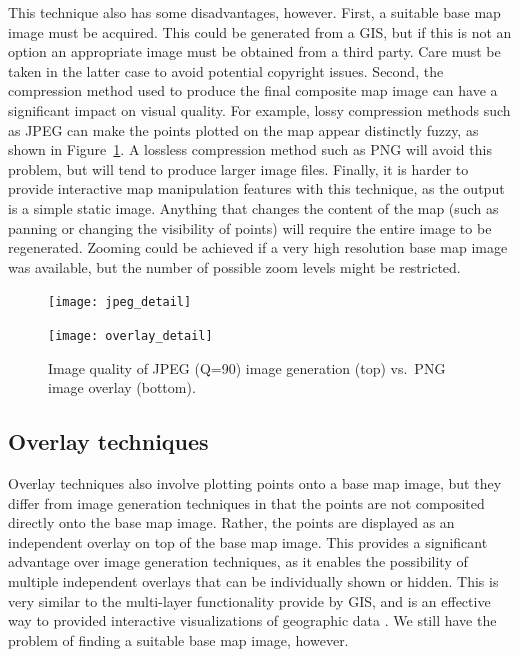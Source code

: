 \documentclass[acmtocl,acmnow]{acmtrans2m}
\begin{document}
This technique also has some disadvantages, however. First, a suitable
base map image must be acquired. This could be generated from a GIS, but
if this is not an option an appropriate image must be obtained from a
third party. Care must be taken in the latter case to avoid potential
copyright issues. Second, the compression method used to produce the
final composite map image can have a significant impact on visual
quality. For example, lossy compression methods such as JPEG can make
the points plotted on the map appear distinctly fuzzy, as shown in
Figure~\ref{fig-image-quality}. A lossless compression method such as
PNG will avoid this problem, but will tend to produce larger image
files. Finally, it is harder to provide interactive map manipulation
features with this technique, as the output is a simple static image.
Anything that changes the content of the map (such as panning or
changing the visibility of points) will require the entire image to be
regenerated. Zooming could be achieved if a very high resolution base
map image was available, but the number of possible zoom levels might be
restricted.


\begin{figure}
	\begin{center}
		\texttt{[image: jpeg\_detail]}\medskip
		
		\texttt{[image: overlay\_detail]}
	\end{center}
	\caption{Image quality of JPEG (Q=90) image generation (top) vs.\
	PNG image overlay (bottom).}
	\label{fig-image-quality}
\end{figure}


\subsection{Overlay techniques}
\label{sec-overlay}


Overlay techniques also involve plotting points onto a base map image,
but they differ from image generation techniques in that the points are
not composited directly onto the base map image. Rather, the points are
displayed as an independent overlay on top of the base map image. This
provides a significant advantage over image generation techniques, as it
enables the possibility of multiple independent overlays that can be
individually shown or hidden. This is very similar to the multi-layer
functionality provide by GIS, and is an effective way to provided
interactive visualizations of geographic data
\cite{Wood-J-1996-vis,MacE-AM-1998-GIS}. We still have the problem of
finding a suitable base map image, however.
\end{document}
